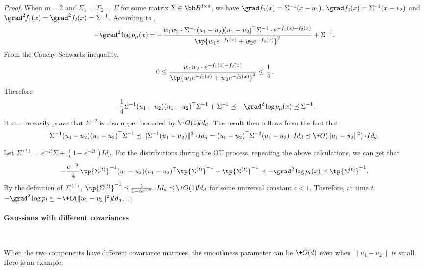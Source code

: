 \begin{proof}
    When $m=2$ and $\Sigma_1 = \Sigma_2 = \Sigma$ for some matrix $\Sigma\in \bb R^{d\times d}$, we have $\grad f_1(x) = \Sigma^{-1}(x-u_1)$, $\grad f_2(x) = \Sigma^{-1}(x-u_2)$ and $\grad^2 f_1(x) = \grad^2 f_2(x) = \Sigma^{-1}$.
According to , 
\begin{align*}
    -\grad^2 \log p_{\mu}(x) = - \frac{w_1w_2\cdot \Sigma^{-1}(u_1-u_2)(u_1-u_2)^{\top}\Sigma^{-1}\cdot e^{-f_1(x) - f_2(x)}}{\tp{w_1 e^{-f_1(x)} + w_2 e^{-f_2(x)}}^2} + \Sigma^{-1}.
\end{align*}
From the Cauchy-Schwartz inequality,
\[
    0 \leq \frac{w_1w_2\cdot e^{-f_1(x) - f_2(x)}}{\tp{w_1 e^{-f_1(x)} + w_2 e^{-f_2(x)}}^2} \leq \frac{1}{4}.
\]
Therefore
\[
    -\frac{1}{4}\Sigma^{-1}(u_1-u_2)(u_1-u_2)^{\top}\Sigma^{-1} + \Sigma^{-1} \preceq -\grad^2 \log p_{\mu}(x) \preceq \Sigma^{-1}.
\]
It can be easily prove that $\Sigma^{-2}$ is also upper bounded by $\+O(1)\!{Id}_d$. The result then follows from the fact that 
\[
    \Sigma^{-1}(u_1-u_2)(u_1-u_2)^{\top}\Sigma^{-1} \preceq \|\Sigma^{-1}(u_1-u_2)\|^2 \cdot \!{Id}_d = (u_1-u_2)^{\top}\Sigma^{-2}(u_1-u_2)\cdot \!{Id}_d \preceq \+O(\|u_1-u_2\|^2)\cdot \!{Id}_d.
\]


Let $\Sigma^{(t)} = e^{-2t}\Sigma + (1-e^{-2t})\!{Id}_d$. For the distributions during the OU process, repeating the above calculations, we can get that
\[
     -\frac{e^{-2t}}{4}\tp{\Sigma^{(t)}}^{-1}(u_1-u_2)(u_1-u_2)^{\top}\tp{\Sigma^{(t)}}^{-1} + \tp{\Sigma^{(t)}}^{-1} \preceq -\grad^2 \log p_t(x) \preceq \tp{\Sigma^{(t)}}^{-1}.
\]
By the definition of $\Sigma^{(t)}$, $ \tp{\Sigma^{(t)}}^{-1} \preceq \frac{1}{1-ce^{-2t}}\cdot \!{Id}_d \preceq \+O(1) \!{Id}_d$ for some universal constant $c<1$. 
Therefore, at time $t$, $-\grad^2 \log p_t \succeq -\+O( \|u_1-u_2\|^2) \!{Id}_d$.
\end{proof}


\paragraph{Gaussians with different covariances}~

When the two components have different covariance matrices, the smoothness parameter can be $\+O(d)$ even when $\|u_1-u_2\|$ is small. Here is an example.


